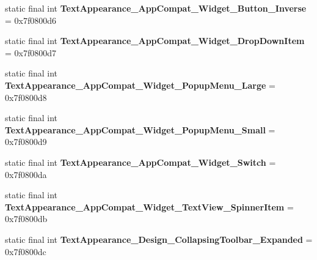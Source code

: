 \begin{DoxyCompactItemize}
\item 
\hypertarget{classandroid_1_1support_1_1design_1_1_r_1_1style_ae2c7ba38fc4c6f627225328c5e11bde9}{}static final int {\bfseries Text\+Appearance\+\_\+\+App\+Compat\+\_\+\+Widget\+\_\+\+Button\+\_\+\+Inverse} = 0x7f0800d6\label{classandroid_1_1support_1_1design_1_1_r_1_1style_ae2c7ba38fc4c6f627225328c5e11bde9}

\item 
\hypertarget{classandroid_1_1support_1_1design_1_1_r_1_1style_a85111e6e10aa78550520255cf9807a59}{}static final int {\bfseries Text\+Appearance\+\_\+\+App\+Compat\+\_\+\+Widget\+\_\+\+Drop\+Down\+Item} = 0x7f0800d7\label{classandroid_1_1support_1_1design_1_1_r_1_1style_a85111e6e10aa78550520255cf9807a59}

\item 
\hypertarget{classandroid_1_1support_1_1design_1_1_r_1_1style_ac31cc585803346f3237a75da48107a04}{}static final int {\bfseries Text\+Appearance\+\_\+\+App\+Compat\+\_\+\+Widget\+\_\+\+Popup\+Menu\+\_\+\+Large} = 0x7f0800d8\label{classandroid_1_1support_1_1design_1_1_r_1_1style_ac31cc585803346f3237a75da48107a04}

\item 
\hypertarget{classandroid_1_1support_1_1design_1_1_r_1_1style_a4be044c1dccfdfd0fc8caef81efad1bd}{}static final int {\bfseries Text\+Appearance\+\_\+\+App\+Compat\+\_\+\+Widget\+\_\+\+Popup\+Menu\+\_\+\+Small} = 0x7f0800d9\label{classandroid_1_1support_1_1design_1_1_r_1_1style_a4be044c1dccfdfd0fc8caef81efad1bd}

\item 
\hypertarget{classandroid_1_1support_1_1design_1_1_r_1_1style_a235664d14c9d1c9eb319a06fca1e7647}{}static final int {\bfseries Text\+Appearance\+\_\+\+App\+Compat\+\_\+\+Widget\+\_\+\+Switch} = 0x7f0800da\label{classandroid_1_1support_1_1design_1_1_r_1_1style_a235664d14c9d1c9eb319a06fca1e7647}

\item 
\hypertarget{classandroid_1_1support_1_1design_1_1_r_1_1style_ad467a646dc2a35f3211088174bdaa35a}{}static final int {\bfseries Text\+Appearance\+\_\+\+App\+Compat\+\_\+\+Widget\+\_\+\+Text\+View\+\_\+\+Spinner\+Item} = 0x7f0800db\label{classandroid_1_1support_1_1design_1_1_r_1_1style_ad467a646dc2a35f3211088174bdaa35a}

\item 
\hypertarget{classandroid_1_1support_1_1design_1_1_r_1_1style_a4467f1c04bd3fe1131c546ec3b57a5f9}{}static final int {\bfseries Text\+Appearance\+\_\+\+Design\+\_\+\+Collapsing\+Toolbar\+\_\+\+Expanded} = 0x7f0800dc\label{classandroid_1_1support_1_1design_1_1_r_1_1style_a4467f1c04bd3fe1131c546ec3b57a5f9}


\end{DoxyCompactItemize}
